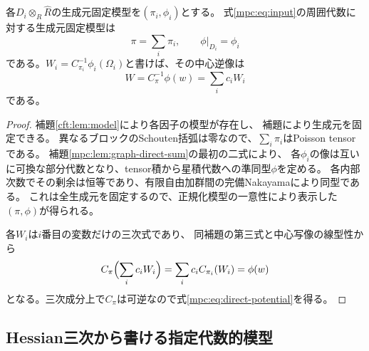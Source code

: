 \begin{proposition}[tensor族の正規化模型と中心の直和]
\label{mpc:prop:normalized-direct-sum}
各$D_i\otimes_R\widehat R$の生成元固定模型を$(\pi_i,\phi_i)$とする。
式\eqref{mpc:eq:input}の周囲代数に対する生成元固定模型は
\[
 \pi=\sum_i\pi_i,
 \qquad \phi|_{D_i}=\phi_i
\]
である。$W_i=C_{\pi_i}^{-1}\phi_i(\Omega_i)$と書けば、その中心逆像は
\begin{equation}\label{mpc:eq:direct-potential}
 W=C_\pi^{-1}\phi(w)=\sum_i c_iW_i
\end{equation}
である。
\end{proposition}
\begin{proof}
補題\ref{cft:lem:model}により各因子の模型が存在し、
補題により生成元を固定できる。
異なるブロックのSchouten括弧は零なので、$\sum_i\pi_i$はPoisson tensorである。
補題\ref{mpc:lem:graph-direct-sum}の最初の二式により、
各$\phi_i$の像は互いに可換な部分代数となり、tensor積から星積代数への準同型$\phi$を定める。
各内部次数でその剰余は恒等であり、有限自由加群間の完備Nakayamaにより同型である。
これは全生成元を固定するので、正規化模型の一意性により表示した$(\pi,\phi)$が得られる。

各$W_i$は$i$番目の変数だけの三次式であり、
同補題の第三式と中心写像の線型性から
\[
 C_\pi\Bigl(\sum_i c_iW_i\Bigr)
 =\sum_i c_i C_{\pi_i}(W_i)
 =\phi(w)
\]
となる。三次成分上で$C_\pi$は可逆なので式\eqref{mpc:eq:direct-potential}を得る。
\end{proof}

\subsection{Hessian三次から書ける指定代数的模型}

